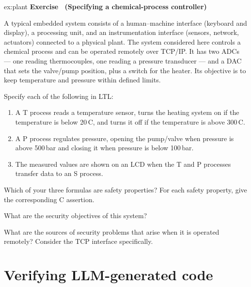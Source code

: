 \documentclass[11pt,a4paper]{article}
\newcounter{exc}
\renewcommand{\theexc}{\arabic{exc}}
\newenvironment{exercise}[2][]
  {\stepcounter{exc}\ifx\relax#1\relax\else\excref{#1}\fi%
   \medskip\noindent\textbf{Exercise \theexc\ (#2)}\par\nopagebreak\smallskip}
  {\par\medskip}
\begin{document}
\begin{exercise}[ex:plant]{Specifying a chemical-process controller}
A typical embedded system consists of a human--machine interface (keyboard and
display), a processing unit, and an instrumentation interface (sensors,
network, actuators) connected to a physical plant. The system considered here
controls a chemical process and can be operated remotely over TCP/IP. It has
two ADCs --- one reading thermocouples, one reading a pressure transducer ---
and a DAC that sets the valve/pump position, plus a switch for the heater. Its
objective is to keep temperature and pressure within defined limits.

\begin{parts}
  \item Specify each of the following in LTL:
        \begin{enumerate}[label=\alph*.,leftmargin=2.2em,topsep=2pt]
          \item A T process reads a temperature sensor, turns the heating system
                on if the temperature is below 20\,\textdegree C, and turns it
                off if the temperature is above 300\,\textdegree C.
          \item A P process regulates pressure, opening the pump/valve when
                pressure is above 500\,bar and closing it when pressure is below
                100\,bar.
          \item The measured values are shown on an LCD when the T and P
                processes transfer data to an S process.
        \end{enumerate}
  \item Which of your three formulas are safety properties? For each safety
        property, give the corresponding C assertion.
  \item What are the security objectives of this system?
  \item What are the sources of security problems that arise when it is operated
        remotely? Consider the TCP interface specifically.
\end{parts}
\end{exercise}

\section{Verifying LLM-generated code}
\end{document}
